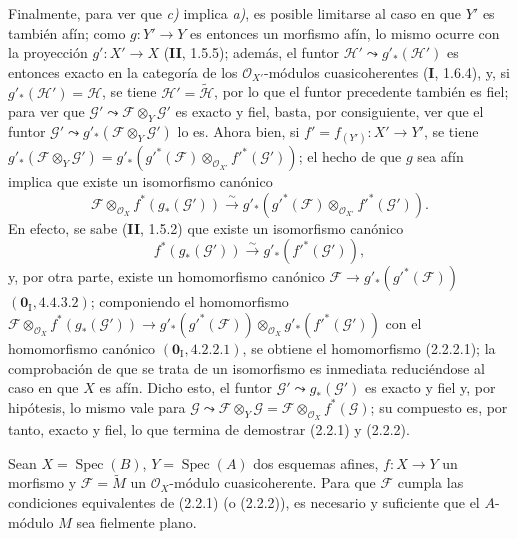 Finalmente, para ver que \emph{c)} implica \emph{a)}, es posible limitarse al
caso en que $Y'$ es también afín; como $g:Y'\to Y$ es entonces un morfismo
afín, lo mismo ocurre con la proyección $g':X'\to X$ (\textbf{II}, 1.5.5); además, el
funtor $\mathscr H'\leadsto g'_*(\mathscr H')$ es entonces exacto en la
categoría de los $\mathcal O_{X'}$-módulos cuasicoherentes (\textbf I, 1.6.4), y, si
$g'_*(\mathscr H')=\mathscr H$, se tiene
$\mathscr H'=\widetilde{\mathscr H}$, por lo que el funtor precedente también
es fiel; para ver que
$\mathscr G'\leadsto\mathscr F\otimes_Y\mathscr G'$ es exacto y fiel, basta,
por consiguiente, ver que el funtor
$\mathscr G'\leadsto g'_*(\mathscr F\otimes_Y\mathscr G')$
lo es. Ahora bien, si $f'=f_{(Y')}:X'\to Y'$, se tiene
$g'_*(\mathscr F\otimes_Y\mathscr G')
=g'_*(g'^*(\mathscr F)\otimes_{\mathcal O_{X'}}f'^*(\mathscr G'))$; el hecho de que $g$
sea afín implica que existe un isomorfismo canónico
\begin{equation}
\tag{2.2.2.1}
\label{IV.2.2.2.1-fr}
\mathscr F\otimes_{\mathcal O_X}f^*(g_*(\mathscr G'))
\xrightarrow{\sim}
g'_*(g'^*(\mathscr F)\otimes_{\mathcal O_{X'}}f'^*(\mathscr G')).
\end{equation}
En efecto, se sabe (\textbf{II}, 1.5.2) que existe un isomorfismo canónico
\[
f^*(g_*(\mathscr G'))\xrightarrow{\sim}g'_*(f'^*(\mathscr G')),
\]
y, por otra parte, existe un homomorfismo canónico
$\mathscr F\to g'_*(g'^*(\mathscr F))$ $(\mathbf{0}_{\mathrm I},4.4.3.2)$;
componiendo el homomorfismo
$\mathscr F\otimes_{\mathcal O_X}f^*(g_*(\mathscr G'))
\to g'_*(g'^*(\mathscr F))\otimes_{\mathcal O_X}g'_*(f'^*(\mathscr G'))$
con el homomorfismo canónico $(\mathbf{0}_{\mathrm I},4.2.2.1)$, se obtiene el
homomorfismo (2.2.2.1); la comprobación de que se trata de un isomorfismo es
inmediata reduciéndose al caso en que $X$ es afín. Dicho esto, el funtor
$\mathscr G'\leadsto g_*(\mathscr G')$ es exacto y fiel y, por hipótesis, lo
mismo vale para
$\mathscr G\leadsto\mathscr F\otimes_Y\mathscr G
=\mathscr F\otimes_{\mathcal O_X}f^*(\mathscr G)$; su compuesto es, por tanto,
exacto y fiel, lo que termina de demostrar (2.2.1) y (2.2.2).

\begin{corollary}[2.2.3]
\label{IV.2.2.3-fr}
Sean $X=\operatorname{Spec}(B)$, $Y=\operatorname{Spec}(A)$ dos esquemas
afines, $f:X\to Y$ un morfismo y $\mathscr F=\widetilde M$ un
$\mathcal O_X$-módulo cuasicoherente. Para que $\mathscr F$ cumpla las
condiciones equivalentes de \textup{(2.2.1)} (o \textup{(2.2.2)}), es necesario y suficiente
que el $A$-módulo $M$ sea fielmente plano.
\end{corollary}

